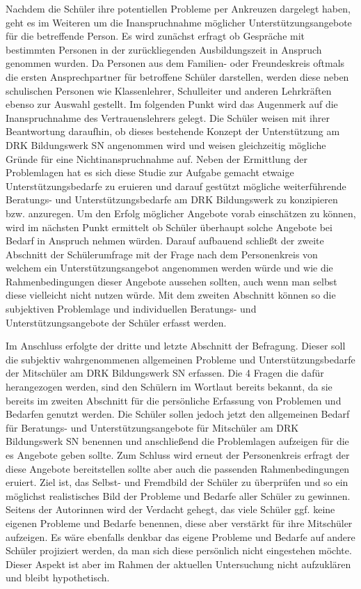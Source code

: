 Nachdem die Schüler ihre potentiellen Probleme per Ankreuzen dargelegt haben, geht es im Weiteren um die Inanspruchnahme möglicher Unterstützungsangebote für die betreffende Person. Es wird zunächst erfragt ob Gespräche mit bestimmten Personen in der zurückliegenden Ausbildungszeit in Anspruch genommen wurden. Da Personen aus dem Familien- oder Freundeskreis oftmals die ersten Ansprechpartner für betroffene Schüler darstellen, werden diese neben schulischen Personen wie Klassenlehrer, Schulleiter und anderen Lehrkräften ebenso zur Auswahl gestellt. Im folgenden Punkt wird das Augenmerk auf die Inanspruchnahme des Vertrauenslehrers gelegt. Die Schüler weisen mit ihrer Beantwortung daraufhin, ob dieses bestehende Konzept der Unterstützung am DRK Bildungswerk SN angenommen wird und weisen gleichzeitig mögliche Gründe für eine Nichtinanspruchnahme auf. Neben der Ermittlung der Problemlagen hat es sich diese Studie zur Aufgabe gemacht etwaige Unterstützungsbedarfe zu eruieren und darauf gestützt mögliche weiterführende Beratungs- und Unterstützungsbedarfe am DRK Bildungswerk zu konzipieren bzw. anzuregen. Um den Erfolg möglicher Angebote vorab einschätzen zu können, wird im nächsten Punkt ermittelt ob Schüler überhaupt solche Angebote bei Bedarf in Anspruch nehmen würden. Darauf aufbauend schließt der zweite Abschnitt der Schülerumfrage mit der Frage nach dem Personenkreis von welchem ein Unterstützungsangebot angenommen werden würde und wie die Rahmenbedingungen dieser Angebote aussehen sollten, auch wenn man selbst diese vielleicht nicht nutzen würde. Mit dem zweiten Abschnitt können so die subjektiven Problemlage und individuellen Beratungs- und Unterstützungsangebote der Schüler erfasst werden. 

Im Anschluss erfolgte der dritte und letzte Abschnitt der Befragung. Dieser soll die subjektiv wahrgenommenen allgemeinen Probleme und Unterstützungsbedarfe der Mitschüler am DRK Bildungswerk SN erfassen. Die 4 Fragen die dafür herangezogen werden, sind den Schülern im Wortlaut bereits bekannt, da sie bereits im zweiten Abschnitt für die persönliche Erfassung von Problemen und Bedarfen genutzt werden. Die Schüler sollen jedoch jetzt den allgemeinen Bedarf für Beratungs- und Unterstützungsangebote für Mitschüler am DRK Bildungswerk SN benennen und anschließend die Problemlagen aufzeigen für die es Angebote geben sollte. Zum Schluss wird erneut der Personenkreis erfragt der diese Angebote bereitstellen sollte aber auch die passenden Rahmenbedingungen eruiert. Ziel ist, das Selbst- und Fremdbild der Schüler zu überprüfen und so ein möglichst realistisches Bild der Probleme und Bedarfe aller Schüler zu gewinnen. Seitens der Autorinnen wird der Verdacht gehegt, das viele Schüler ggf. keine eigenen Probleme und Bedarfe benennen, diese aber verstärkt für ihre Mitschüler aufzeigen. Es wäre ebenfalls denkbar das eigene Probleme und Bedarfe auf andere Schüler projiziert werden, da man sich diese persönlich nicht eingestehen möchte. Dieser Aspekt ist aber im Rahmen der aktuellen Untersuchung nicht aufzuklären und bleibt hypothetisch. 

